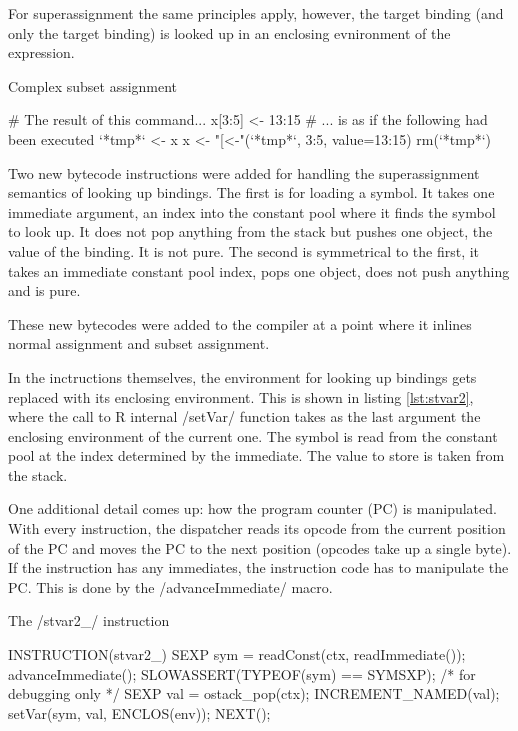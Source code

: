 For superassignment the same principles apply, however, the target binding (and only the target binding) is looked up in an enclosing evnironment of the expression.

\begin{listing}[htbp]
  \caption{\label{lst:subassign}Complex subset assignment}
  \begin{rcode}
# The result of this command...
x[3:5] <- 13:15
# ... is as if the following had been executed
`*tmp*` <- x
x <- "[<-"(`*tmp*`, 3:5, value=13:15)
rm(`*tmp*`)
  \end{rcode}
\end{listing}

Two new bytecode instructions were added for handling the superassignment semantics of looking up bindings. The first is for loading a symbol. It takes one immediate argument, an index into the constant pool where it finds the symbol to look up. It does not pop anything from the stack but pushes one object, the value of the binding. It is not pure. The second is symmetrical to the first, it takes an immediate constant pool index, pops one object, does not push anything and is pure.\todo[pureness]

These new bytecodes were added to the compiler at a point where it inlines normal assignment and subset assignment.

In the inctructions themselves, the environment for looking up bindings gets replaced with its enclosing environment. This is shown in listing \ref{lst:stvar2}, where the call to R internal \cinline/setVar/ function takes as the last argument the enclosing environment of the current one. The symbol is read from the constant pool at the index determined by the immediate. The value to store is taken from the stack.

One additional detail comes up: how the program counter (PC) is manipulated. With every instruction, the dispatcher reads its opcode from the current position of the PC and moves the PC to the next position (opcodes take up a single byte). If the instruction has any immediates, the instruction code has to manipulate the PC. This is done by the \cinline/advanceImmediate/ macro.

\begin{listing}[htbp]
  \caption{\label{lst:stvar2}The \cinline/stvar2_/ instruction}
  \begin{ccode}
INSTRUCTION(stvar2_) {
    SEXP sym = readConst(ctx, readImmediate());
    advanceImmediate();
    SLOWASSERT(TYPEOF(sym) == SYMSXP);  /* for debugging only */
    SEXP val = ostack_pop(ctx);
    INCREMENT_NAMED(val);
    setVar(sym, val, ENCLOS(env));
    NEXT();
}
  \end{ccode}
\end{listing}

